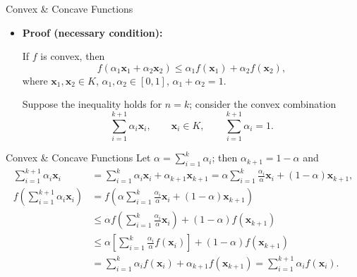 \documentclass[aspectratio=169,hyperref,UTF8,CJK]{beamer}
\newcommand{\vect}[1]{\boldsymbol{#1}}
\begin{document}
\begin{frame}{Convex \& Concave Functions}
  \small
  \begin{itemize}
    \item \textbf{Proof (necessary condition):}

      If $f$ is convex, then
      \begin{equation*}
        f(\alpha_1\vect{x}_1+\alpha_2\vect{x}_2)
        \le\alpha_1f(\vect{x}_1)+\alpha_2f(\vect{x}_2),
      \end{equation*}
      where $\vect{x}_1,\vect{x}_2\in K$, $\alpha_1,\alpha_2\in[0,1]$, $\alpha_1+\alpha_2=1$.

      Suppose the inequality holds for $n=k$; consider the convex combination
      \begin{equation*}
        \sum_{i=1}^{k+1}\alpha_i\vect{x}_i,
        \qquad \vect{x}_i\in K,\qquad
        \sum_{i=1}^{k+1}\alpha_i=1.
      \end{equation*}
  \end{itemize}
\end{frame}

\begin{frame}{Convex \& Concave Functions}
  \scriptsize
  Let $\alpha=\sum_{i=1}^{k}\alpha_i$; then $\alpha_{k+1}=1-\alpha$ and
  \begin{align*}
    \sum_{i=1}^{k+1}\alpha_i\vect{x}_i
      &=\sum_{i=1}^{k}\alpha_i\vect{x}_i+\alpha_{k+1}\vect{x}_{k+1}
       =\alpha\sum_{i=1}^{k}\frac{\alpha_i}{\alpha}\vect{x}_i+(1-\alpha)\vect{x}_{k+1},\\[1mm]
    f\left(\sum_{i=1}^{k+1}\alpha_i\vect{x}_i\right)
      &=f\left(\alpha\sum_{i=1}^{k}\frac{\alpha_i}{\alpha}\vect{x}_i+(1-\alpha)\vect{x}_{k+1}\right)\\
      &\le\alpha f\left(\sum_{i=1}^{k}\frac{\alpha_i}{\alpha}\vect{x}_i\right)+(1-\alpha)f(\vect{x}_{k+1})\\
      &\le\alpha\left[\sum_{i=1}^{k}\frac{\alpha_i}{\alpha}f(\vect{x}_i)\right]+(1-\alpha)f(\vect{x}_{k+1})\\
      &=\sum_{i=1}^{k}\alpha_i f(\vect{x}_i)+\alpha_{k+1}f(\vect{x}_{k+1})
       =\sum_{i=1}^{k+1}\alpha_i f(\vect{x}_i).
  \end{align*}
\end{frame}
\end{document}
